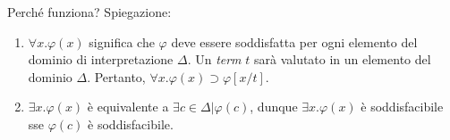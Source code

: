 Perché funziona? Spiegazione:
\begin{enumerate}
\item $\forall x . \varphi(x)$ significa che $\varphi$ deve essere soddisfatta per ogni elemento del dominio di interpretazione $\Delta$. Un \textit{term} $t$ sarà valutato in un elemento del dominio $\Delta$. Pertanto, $\forall x. \varphi(x) \supset \varphi[x/t]$.
\item $\exists x. \varphi(x)$ è equivalente a $\exists c \in \Delta | \varphi(c)$, dunque $\exists x. \varphi(x)$ è soddisfacibile sse $\varphi(c)$ è soddisfacibile.
\end{enumerate}

\noindent\hrulefill
\vspace{1em}
